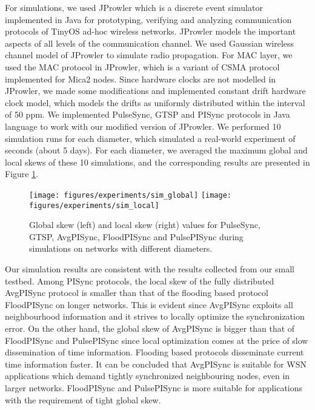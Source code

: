 \documentclass[english,a4paper,10pt,final]{article}
\numberwithin{equation}{section}
\numberwithin{figure}{section}
\begin{document}
For simulations, we used JProwler \cite{JProwler} which is a discrete event simulator implemented in Java for prototyping, verifying and analyzing communication protocols of TinyOS ad-hoc wireless networks. JProwler models the important aspects of all levels of the communication channel. We used Gaussian wireless channel model of JProwler to simulate radio propagation. For MAC layer, we used the MAC protocol in JProwler, which is a variant of CSMA protocol implemented for Mica2 nodes. Since hardware clocks are not modelled in JProwler, we made some modifications and implemented constant drift hardware clock model, which models the drifts as uniformly distributed within the interval of  50 ppm. We implemented PulseSync, GTSP and PISync protocols in Java language to work with our modified version of JProwler. We performed 10 simulation runs for each diameter, which simulated a real-world experiment of  seconds (about 5 days). For each diameter, we averaged the maximum global and local skews of these 10 simulations, and the corresponding results are presented in Figure \ref{fig:simulations}.

\begin{figure}
\center

\texttt{[image: figures/experiments/sim\_global]}
\texttt{[image: figures/experiments/sim\_local]}

\caption{\label{fig:simulations} Global skew (left) and local skew (right) values for PulseSync, GTSP, AvgPISync, FloodPISync and PulsePISync during simulations on networks with different diameters.}
\end{figure}

Our simulation results are consistent with the results collected from our small testbed. Among PISync protocols, the local skew of the fully distributed AvgPISync protocol is smaller than that of the flooding based protocol FloodPISync on longer networks. This is evident since AvgPISync exploits all neighbourhood information and it strives to locally optimize the synchronization error. On the other hand, the global skew of AvgPISync is bigger than that of FloodPISync and PulsePISync since local optimization comes at the price of slow dissemination of time information. Flooding based protocols disseminate current time information faster. It can be concluded that AvgPISync is suitable for WSN applications which demand tightly synchronized neighbouring nodes, even in larger networks. FloodPISync and PulsePISync is more suitable for applications with the requirement of tight global skew. 
\end{document}
